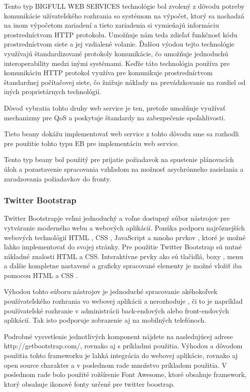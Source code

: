 Tento typ BIGFULL WEB SERVICES technológie bol zvolený z dôvodu potreby komunikácie užívateľského rozhrania so systémom na výpočet, ktorý sa nachadzá na inom výpočetom zariadení a tieto zariadenia si vymieňajú informáciu prostredníctvom HTTP protokolu. Umožňuje nám teda zdieľať funkčnosť kódu prostredníctvom siete a jej vzdialené volanie. Ďalšou výodou tejto technológie využívajú štandardizované protokoly komunikácie, čo umožňuje jednoduchú interoperability medzi inými systémami. Keďže táto technológia používa pre komunikáciu HTTP protokol využíva pre komunikuje prostredníctvom štandardnej počítačovej siete, čo žnižuje náklady na prevádzkovanie na rozdiel od iných proprietárnych technológií.

Dôvod vybratia tohto druhy web service je ten, pretože umožňuje využívať mechanizmy pre QoS a poskytuje štandardy na zabezpečenie spoľahlivosti.

Tieto beany dokážu implementovať web service z tohto dôvodu sme sa rozhodli pre použitie tohto typu EB pre implementáciu web service.

 Tento typ beany bol použitý pre prijatie požiadavok na spustenie plánovacích úloh a pozastavenie spracovania vzhľadom na možnosť asychrónneho zasielania a zaradzovania požiadavkov do fronty.

\subsubsection{Twitter Bootstrap}
Twitter Bootstrapje veľmi jednoduchý a voľne dostupný súbor nástrojov pre vytváranie moderného webu a webových aplikácií.\cite{boot} Ponúka podporu najrôznejších webových technológií HTML , CSS , JavaScript a mnoho prvkov , ktoré je možné ľahko implementovať do svojej stránky. Pre použitie Twitter Bootstrap sú nutné základné znalosti HTML a CSS. Interaktívne prvky ako sú tlačidlá, boxy , menu a ďalšie kompletne nastavené a graficky spracované elementy je možné vložiť iba pomocou HTML a CSS .

Výhodou tohto súboru nástrojov je jednoduché spracovanie akéhokoľvek používateľského rozhrania vo webovej aplikácii a nerozhoduje , či to je napríklad používateľské rozhranie v administrácii back-endových alebo front-endových aplikácií. Tak isto podporuje zobrazenie aj na mobilných telefónoch.


Podrobné vysvetlenie jednotlivých komponent nájdete na nasledujúcej adrese http://getbootstrap.com/, rovnako aj s príkladmi použitia. Výhodou a dôvodom použitia tohto frameworku je lahká integrácia do webovej aplikácie, rovnako aj open source charakter a v poslednom rade množstvo príkladom použitia. V poslednom rade bolo použité rožšírenie Font Awesome, ktoré obsahuje framework, ktorý obsahuje ikonové fonty určené pre twitter boostrap.


